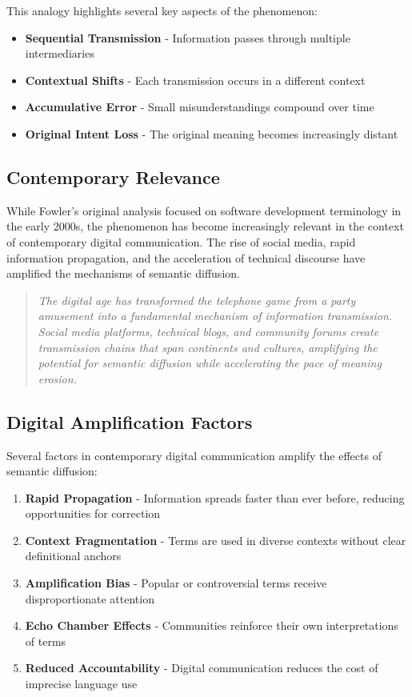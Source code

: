 \documentclass[11pt]{article}
\begin{document}
This analogy highlights several key aspects of the phenomenon:

\begin{itemize}
\item \textbf{Sequential Transmission} - Information passes through multiple intermediaries
\item \textbf{Contextual Shifts} - Each transmission occurs in a different context
\item \textbf{Accumulative Error} - Small misunderstandings compound over time
\item \textbf{Original Intent Loss} - The original meaning becomes increasingly distant
\end{itemize}

\subsection{Contemporary Relevance}

While Fowler's original analysis focused on software development terminology in the early 2000s, the phenomenon has become increasingly relevant in the context of contemporary digital communication. The rise of social media, rapid information propagation, and the acceleration of technical discourse have amplified the mechanisms of semantic diffusion.

\begin{quote}
\emph{The digital age has transformed the telephone game from a party amusement into a fundamental mechanism of information transmission. Social media platforms, technical blogs, and community forums create transmission chains that span continents and cultures, amplifying the potential for semantic diffusion while accelerating the pace of meaning erosion.}
\end{quote}

\subsection{Digital Amplification Factors}

Several factors in contemporary digital communication amplify the effects of semantic diffusion:

\begin{enumerate}
\item \textbf{Rapid Propagation} - Information spreads faster than ever before, reducing opportunities for correction
\item \textbf{Context Fragmentation} - Terms are used in diverse contexts without clear definitional anchors
\item \textbf{Amplification Bias} - Popular or controversial terms receive disproportionate attention
\item \textbf{Echo Chamber Effects} - Communities reinforce their own interpretations of terms
\item \textbf{Reduced Accountability} - Digital communication reduces the cost of imprecise language use
\end{enumerate}
\end{document}
